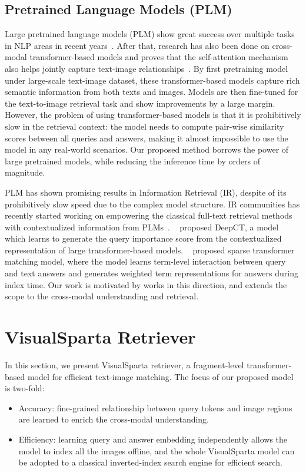 \documentclass[11pt,a4paper]{article}
\begin{document}
\subsection{Pretrained Language Models (PLM)}
Large pretrained language models (PLM) show great success over multiple tasks in NLP areas in recent years~\cite{devlin2018bert,yang2019xlnet,dai2019transformer}.  After that, research has also been done on cross-modal transformer-based models and proves that the self-attention mechanism also helps jointly capture text-image relationships~\cite{li2019visualbert,lu202012,qi2020imagebert,li2020oscar}. By first pretraining model under large-scale text-image dataset, these transformer-based models capture rich semantic information from both texts and images. Models are then fine-tuned for the text-to-image retrieval task and show improvements by a large margin. However, the problem of using transformer-based models is that it is prohibitively slow in the retrieval context: the model needs to compute pair-wise similarity scores between all queries and answers, making it almost impossible to use the model in any real-world scenarios. Our proposed method borrows the power of large pretrained models, while reducing the inference time by orders of magnitude.

PLM has shown promising results in Information Retrieval (IR), despite of its prohibitively slow speed due to the complex model structure. IR communities has recently started working on empowering the classical full-text retrieval methods with contextualized information from PLMs~\cite{dai2019context,macavaney2020expansion,zhao2020sparta}. ~\citet{dai2019context} proposed DeepCT, a model which learns to generate the query importance score from the contextualized representation of large transformer-based models. ~\citet{zhao2020sparta} proposed sparse transformer matching model, where the model learns term-level interaction between query and text answers and generates weighted term representations for answers during index time. Our work is motivated by works in this direction, and extends the scope to the cross-modal understanding and retrieval.

 
\section{VisualSparta Retriever}
In this section, we present VisualSparta retriever, a fragment-level transformer-based model for efficient text-image matching. The focus of our proposed model is two-fold: 
\begin{itemize}
    \item Accuracy: fine-grained relationship between query tokens and image regions are learned to enrich the cross-modal understanding.
    \item Efficiency: learning query and answer embedding independently allows the model to index all the images offline, and the whole VisualSparta model can be adopted to a classical inverted-index search engine for efficient search. 
\end{itemize}
\end{document}
